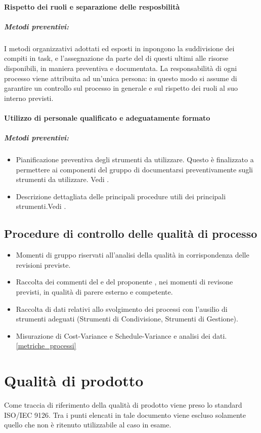 \documentclass[12pt,a4paper]{article}
\begin{document}
\paragraph{Rispetto dei ruoli e separazione delle resposbilità}
\subparagraph{Metodi preventivi:}
I metodi organizzativi adottati ed esposti in \NdP inpongono la suddivisione dei compiti in task, e l'assegnazione da parte del \PM di questi ultimi alle risorse disponibili, in maniera preventiva e documentata. 
La responsabilità di ogni processo viene attribuita ad un'unica persona: in questo modo si assume di garantire un controllo sul processo in generale e sul rispetto dei ruoli al suo interno previsti.
\paragraph{Utilizzo di personale qualificato e adeguatamente formato}
\subparagraph{Metodi preventivi:}
\begin{itemize}
	\item Pianificazione preventiva degli strumenti da utilizzare. Questo è finalizzato a permettere ai componenti del gruppo di documentarsi preventivamente sugli strumenti da utilizzare. Vedi \NdP{}.
	\item Descrizione dettagliata delle principali procedure utili dei principali strumenti.Vedi \NdP{}.
\end{itemize}

\subsection{Procedure di controllo delle qualità di processo}
\begin{itemize}
	\item Momenti di gruppo riservati all'analisi della qualità in corrispondenza delle revisioni previste.
	\item Raccolta dei commenti del \Vardanega e del proponente \Zucchetti, nei momenti di revisone previsti, in qualità di parere esterno e competente.
	\item Raccolta di dati relativi allo svolgimento dei processi con l'ausilio di strumenti adeguati (Strumenti di Condivisione, Strumenti di Gestione).
	\item Misurazione di Cost-Variance e Schedule-Variance e analisi dei dati.\ref{metriche_processi}	
\end{itemize}

\section{Qualità di prodotto}
Come traccia di riferimento della qualità di prodotto viene preso lo standard ISO/IEC 9126. Tra i punti elencati in tale documento viene escluso solamente quello che non è ritenuto utilizzabile al caso in esame.
\end{document}
